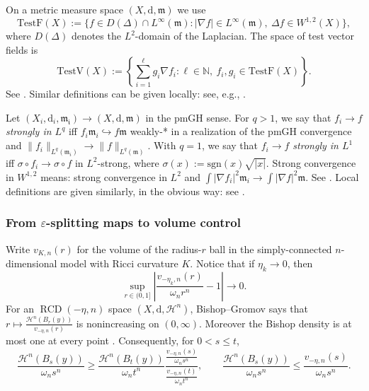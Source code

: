 \documentclass[12pt,a4paper,reqno]{amsart}
\renewcommand{\leq}{\leqslant}
\renewcommand{\geq}{\geqslant}
\newcommand{\Hn}{\mathcal H^n}
\newcommand{\TestF}{\mathrm{TestF}}
\newcommand{\TestV}{\mathrm{TestV}}
\begin{document}
On a metric measure space $(X,\mathrm{d},\mathfrak{m})$ we use
\[
 \TestF(X):=\bigl\{f\in D(\Delta)\cap L^\infty(\mathfrak m):
 |\nabla f|\in L^\infty(\mathfrak m),\
 \Delta f\in W^{1,2}(X)\bigr\},
\]
where $D(\Delta)$ denotes the $L^2$-domain of the Laplacian.  The
space of test vector fields is
\[
 \TestV(X):=\left\{\sum_{i=1}^{\ell}g_i\nabla f_i:
 \ell\in\mathbb N,\ f_i,g_i\in\TestF(X)\right\}.
\]
See \cite{GigliNDG}. Similar definitions can be given locally: see, e.g., \cite[Section 2]{GigliViolo}.
\medskip

Let $(X_i,\mathrm{d}_i,\mathfrak{m_i})\to (X,\mathrm{d},\mathfrak{m})$ in the pmGH sense. For $q>1$, we say that \emph{$f_i\to f$ strongly in $L^q$} iff $f_i\mathfrak{m}_i\hookrightarrow f\mathfrak{m}$ weakly-* in a realization of the pmGH convergence and $\|f_i\|_{L^q(\mathfrak{m}_i)}\to \|f\|_{L^q(\mathfrak{m})}$. With $q=1$, we say that \emph{$f_i\to f$ strongly in $L^1$} iff $\sigma\circ f_i\to \sigma\circ f$ in $L^2$-strong, where $\sigma(x):=\mathrm{sgn}(x)\sqrt{|x|}$. Strong convergence in $W^{1,2}$ means: strong convergence in $L^2$ and $\int|\nabla f_i|^2\mathfrak{m}_i\to \int |\nabla f|^2\mathfrak{m}$. See \cite[Section 1.3]{AmbrosioHonda}. Local definitions are given similarly, in the obvious way: see \cite[Section 4]{AmbrosioHondaSpectral}.

\subsubsection{From $\varepsilon$-splitting maps to volume control} Write $v_{K,n}(r)$ for the volume of the radius-$r$ ball in the
simply-connected $n$-dimensional model with Ricci curvature $K$. 
Notice that if $\eta_k\to 0$, then
\begin{equation}\label{eq:Phi-expansion}
\sup_{r\in (0,1]} \left|\frac{v_{-\eta_k,n}(r)}{\omega_n r^n}-1\right|\to 0.
\end{equation}
For an $\operatorname{RCD}(-\eta,n)$ space $(X,\mathrm{d},\mathcal{H}^n)$, Bishop--Gromov says that $
 r\mapsto\frac{\Hn(B_r(y))}{v_{-\eta,n}(r)}$
is nonincreasing on $(0,\infty)$.  Moreover the Bishop density is at most
one at every point \cite[Corollary~2.14]{DePhilippisGigli}.
Consequently, for $0<s\leq t$,
\begin{equation}\label{eq:negative-BG-exact}
 \frac{\mathcal{H}^n(B_s(y))}{\omega_n s^n}\geq \frac{\mathcal{H}^n(B_t(y))}{\omega_n t^n}
 \frac{\frac{v_{-\eta,n}(s)}{\omega_n s^n}}{\frac{v_{-\eta,n}(t)}{\omega_n t^n}},
 \qquad
 \frac{\mathcal{H}^n(B_s(y))}{\omega_n s^n}\leq \frac{v_{-\eta,n}(s)}{\omega_n s^n}.
\end{equation}
\end{document}
